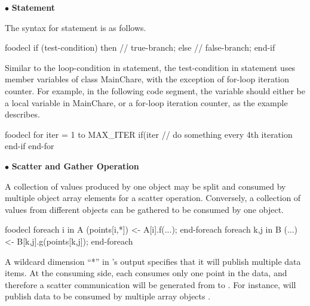 $\bullet$ {\bf {} Statement}

The syntax for  statement is as follows.
\begin{SaveVerbatim}{foodecl}
  if (test-condition) then
    // true-branch;
  else
    // false-branch;
  end-if
\end{SaveVerbatim}
\vspace{0.1in}
\vspace{0.1in}

Similar to the loop-condition in  statement, the test-condition in
 statement uses member variables of class MainChare, with the exception
of for-loop iteration counter. For example, in the following code
segment, the variable  should either be a local variable in
MainChare, or a for-loop iteration counter, as the example describes.

\begin{SaveVerbatim}{foodecl}
  for iter = 1 to MAX_ITER
    if(iter %
      // do something every 4th iteration
    end-if
  end-for
\end{SaveVerbatim}
\vspace{0.1in}
\vspace{0.1in}

$\bullet$ {\bf Scatter and Gather Operation}

A collection of values produced by one object may be split and consumed by
multiple object array elements for a scatter operation. Conversely, a collection
of values from different objects can be gathered to be consumed by one object.

\begin{SaveVerbatim}{foodecl}
  foreach i in A
    (points[i,*]) <- A[i].f(...);
  end-foreach
  foreach k,j in B
    (...) <- B[k,j].g(points[k,j]);
  end-foreach
\end{SaveVerbatim}
\vspace{0.1in}
\vspace{0.1in}

A wildcard dimension ``*'' in 's output  specifies
that it will publish multiple data items. At the consuming side, each
 consumes only one point in the data, and therefore a scatter
communication will be generated from  to . For instance,
 will publish data  to be consumed by multiple
array objects .  

